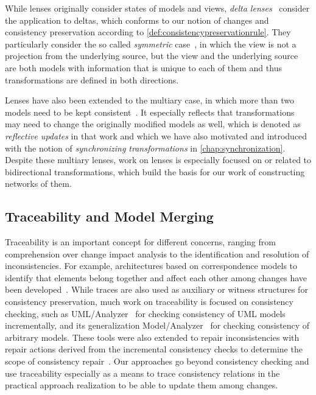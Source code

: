 While lenses %
originally consider states of models and views, \emph{delta lenses}~\cite{diskin2011StateToDeltaSymmetric-MODELS} consider the application to deltas, which conforms to our notion of changes and consistency preservation according to \autoref{def:consistencypreservationrule}.
They particularly consider the so called \emph{symmetric} case~\cite{diskin2011StateToDeltaSymmetric-MODELS}, in which the view is not a projection from the underlying source, but the view and the underlying source are both models with information that is unique to each of them and thus transformations are defined in both directions.

Lenses have also been extended to the multiary case, in which more than two models need to be kept consistent~\cite{diskin2018MultiModelSynchronization-FASE}.
It especially reflects that transformations may need to change the originally modified models as well, which is denoted as \emph{reflective updates} in that work and which we have also motivated and introduced with the notion of \emph{synchronizing transformations} in \autoref{chap:synchronization}.
Despite these multiary lenses, work on lenses is especially focused on or related to bidirectional transformations, which build the basis for our work of constructing networks of them.


\subsection{Traceability and Model Merging}

Traceability is an important concept for different concerns, ranging from comprehension over change impact analysis to the identification and resolution of inconsistencies.
For example, architectures based on correspondence models to identify that elements belong together and affect each other among changes have been developed~\cite{szabo2013traceabilityConsistency-ASWEC}.
While traces are also used as auxiliary or witness structures for consistency preservation, much work on traceability is focused on consistency checking, such as UML/Analyzer~\cite{egyed2006umlanalyzer-ICSE} for checking consistency of \gls{UML} models incrementally, and its generalization Model/Analyzer~\cite{egyed2011modelanalyzer-TSE} for checking consistency of arbitrary models.
These tools were also extended to repair inconsistencies with repair actions derived from the incremental consistency checks to determine the scope of consistency repair~\cite{reder2012resolvingInconsistencies-ASE}.
Our approaches go beyond consistency checking and use traceability especially as a means to trace consistency relations in the practical approach realization to be able to update them among changes.

